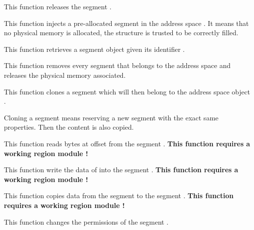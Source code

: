 {
  This function releases the segment .
}


{
  This function injects a pre-allocated segment in the
  address space . It means that no physical
  memory is allocated, the  structure is
  trusted to be correctly filled.
}

{
  This function retrieves a segment object  given its identifier
  .
}

{
  This function removes every segment that belongs to
  the address space  and releases the
  physical memory associated.
}

{
  This function clones a segment which will then belong to
  the address space object .

  Cloning a segment means reserving a new segment with the
  exact same properties. Then the content is also copied.
}

{
  This function reads  bytes at offset
   from the segment . \newline
  \textbf{This function requires a working region module !}
}

{
  This function write the data of  into the
  segment . \newline
  \textbf{This function requires a working region module !}
}

{
  This function copies data from the segment  to
  the segment . \newline
  \textbf{This function requires a working region module !}
}

{
  This function changes the permissions of the segment .
}


